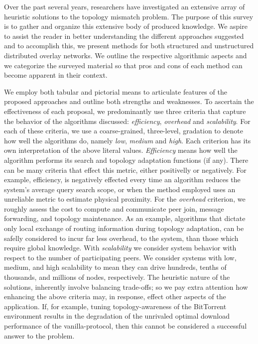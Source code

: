 Over the past several years, researchers have investigated an extensive
array of heuristic solutions to the topology mismatch problem.
The purpose of this survey is to gather and organize 
this extensive body of produced knowledge. 
We aspire to assist the reader in better understanding the 
different approaches suggested and to accomplish this, we 
present methods for both structured and unstructured distributed 
overlay networks.
We outline the respective algorithmic aspects and we categorize
the surveyed material so that pros and cons of each method
can become apparent in their context.

We employ both tabular and pictorial means to 
articulate features of the proposed approaches and outline 
both strengths and weaknesses.
To ascertain the effectiveness of each proposal, we predominantly use 
three criteria that capture the behavior of the algorithms 
discussed:
\emph{efficiency}, \emph{overhead} and \emph{scalability}.
For each of these criteria, we use a coarse-grained,
three-level, gradation to denote how well the algorithms do,
namely \emph{low}, \emph{medium} and \emph{high}.
Each criterion has its own
interpretation of the above literal values. 
\emph{Efficiency} means how well the
algorithm performs its search and topology adaptation functions (if any). There
can be many criteria that effect this metric, either positivelly or negatively.
For example, efficiency, is negatively effected every time an algorithm
reduces the system's average query search scope, or when the method employed
uses an unreliable metric to estimate physical proximity.
For the \emph{overhead} criterion, we roughly assess the cost
to compute and communicate peer join, message forwarding, 
and topology maintenance. As an example, algorithms that dictate only local
exchange of routing information during topology adaptation, can be safelly
considered to incur far less overhead, to the system, than those which
require global knowledge.
With \emph{scalability} we consider system behavior
with respect to the number of participating peers. We consider systems with low,
medium, and high scalability to mean they can drive hundreds, tenths of
thousands, and millions of nodes, respectively.
The heuristic nature of the solutions, inherently involve balancing trade-offs;
so we pay extra attention how enhancing the above criteria may, in response,
effect other aspects of the application. If, for example, tuning
topology-awareness of the BitTorrent environment results in the degradation of
the unrivaled optimal download performance of the vanilla-protocol, then this
cannot be considered a successful answer to the problem.



